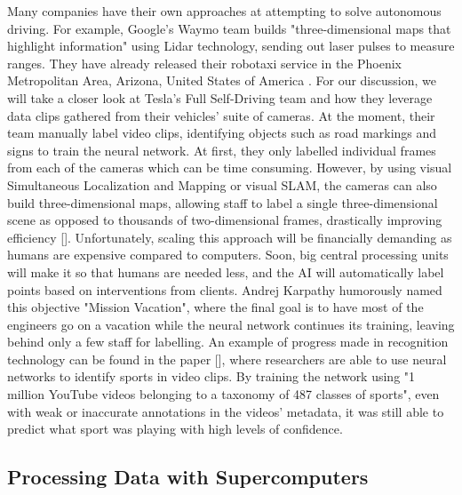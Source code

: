 \documentclass{article}
\begin{document}
Many companies have their own approaches at attempting to solve autonomous driving. For example, Google's Waymo team builds "three-dimensional maps that highlight information" using Lidar technology, sending out laser pulses to measure ranges. They have already released their robotaxi service in the Phoenix Metropolitan Area, Arizona, United States of America \textcite{waymo}. For our discussion, we will take a closer look at Tesla's Full Self-Driving team and how they leverage data clips gathered from their vehicles' suite of cameras. At the moment, their team manually label video clips, identifying objects such as road markings and signs to train the neural network. At first, they only labelled individual frames from each of the cameras which can be time consuming. However, by using visual Simultaneous Localization and Mapping or visual SLAM, the cameras can also build three-dimensional maps, allowing staff to label a single three-dimensional scene as opposed to thousands of two-dimensional frames, drastically improving efficiency [\textcite{durrant2006simultaneous}].
\bigbreak
Unfortunately, scaling this approach will be financially demanding as humans are expensive compared to computers. Soon, big central processing units will make it so that humans are needed less, and the AI will automatically label points based on interventions from clients. Andrej Karpathy humorously named this objective "Mission Vacation", where the final goal is to have most of the engineers go on a vacation while the neural network continues its training, leaving behind only a few staff for labelling. An example of progress made in recognition technology can be found in the paper [\textcite{karpathy2014large}], where researchers are able to use neural networks to identify sports in video clips. By training the network using "1 million YouTube videos belonging to a taxonomy of 487 classes of sports", even with weak or inaccurate annotations in the videos' metadata, it was still able to predict what sport was playing with high levels of confidence.

\subsection{Processing Data with Supercomputers}
\end{document}
